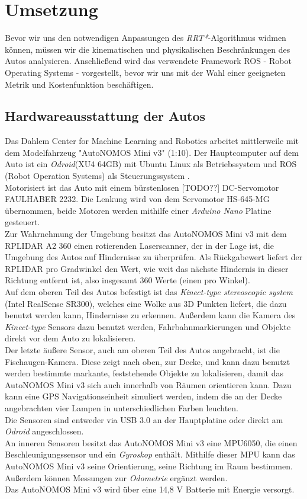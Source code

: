 \section{Umsetzung}
Bevor wir uns den notwendigen Anpassungen des \textit{RRT*}-Algorithmus widmen können, müssen wir die kinematischen und physikalischen Beschränkungen des Autos analysieren. Anschließend wird das verwendete Framework ROS - Robot Operating Systems - vorgestellt, bevor wir uns mit der Wahl einer geeigneten Metrik und Kostenfunktion beschäftigen.
\subsection{Hardwareausstattung der Autos}
Das Dahlem Center for Machine Learning and Robotics arbeitet mittlerweile mit dem Modelfahrzeug "AutoNOMOS Mini v3" (1:10). Der Hauptcomputer auf dem Auto ist ein \textit{Odroid}(XU4 64GB) mit Ubuntu Linux als Betriebssystem und ROS (Robot Operation Systems) als Steuerungssystem \citep{fubAuto}. \\ [TODO Bild einfügen]
Motorisiert ist das Auto mit einem bürstenlosen [TODO??] DC-Servomotor FAULHABER 2232. Die Lenkung wird von dem Servomotor HS-645-MG übernommen, beide Motoren werden mithilfe einer \textit{Arduino Nano} Platine gesteuert. \\
Zur Wahrnehmung der Umgebung besitzt das AutoNOMOS Mini v3 mit dem RPLIDAR A2 360 einen rotierenden Laserscanner, der in der Lage ist, die Umgebung des Autos auf Hindernisse zu überprüfen. Als Rückgabewert liefert der RPLIDAR pro Gradwinkel den Wert, wie weit das nächste Hindernis in dieser Richtung entfernt ist, also insgesamt 360 Werte (einen pro Winkel). \\
Auf dem oberen Teil des Autos befestigt ist das \textit{Kinect-type stereoscopic system} (Intel RealSense SR300), welches eine Wolke aus 3D Punkten liefert, die dazu benutzt werden kann, Hindernisse zu erkennen. Außerdem kann die Kamera des \textit{Kinect-type} Sensors dazu benutzt werden, Fahrbahnmarkierungen und Objekte direkt vor dem Auto zu lokalisieren.\\
Der letzte äußere Sensor, auch am oberen Teil des Autos angebracht, ist die Fischaugen-Kamera. Diese zeigt nach oben, zur Decke, und kann dazu benutzt werden bestimmte markante, feststehende Objekte zu lokalisieren, damit das AutoNOMOS Mini v3 sich auch innerhalb von Räumen orientieren kann. Dazu kann eine GPS Navigationseinheit simuliert werden, indem die an der Decke angebrachten vier Lampen in unterschiedlichen Farben leuchten. \\
Die Sensoren sind entweder via USB 3.0 an der Hauptplatine oder direkt am \textit{Odroid} angeschlossen. \\
An inneren Sensoren besitzt das AutoNOMOS Mini v3 eine MPU6050, die einen Beschleunigungssensor und ein \textit{Gyroskop} enthält. Mithilfe dieser MPU kann das AutoNOMOS Mini v3 seine Orientierung, seine Richtung im Raum bestimmen. Außerdem können Messungen zur \textit{Odometrie} ergänzt werden.\\
Das AutoNOMOS Mini v3 wird über eine 14,8 V Batterie mit Energie versorgt.

